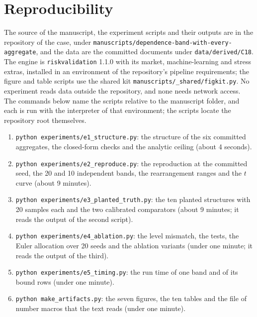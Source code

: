 \section{Reproducibility}
\label{sec:reproducibility}

The source of the manuscript, the experiment scripts and their outputs are in the repository of the case, under
\texttt{manuscripts/dependence-band-with-every-aggregate}, and the data are the committed documents under
\texttt{data/derived/C18}. The engine is \texttt{riskvalidation} 1.1.0 with its market, machine-learning and stress extras,
installed in an environment of the repository's pipeline requirements; the figure and table scripts use the shared kit
\texttt{manuscripts/\_shared/figkit.py}. No experiment reads data outside the repository, and none needs network access. The
commands below name the scripts relative to the manuscript folder, and each is run with the interpreter of that environment; the
scripts locate the repository root themselves.

\begin{enumerate}
\item \texttt{python experiments/e1\_structure.py}: the structure of the six
committed aggregates, the closed-form checks and the analytic ceiling (about 4 seconds).
\item \texttt{python experiments/e2\_reproduce.py}: the reproduction at the
committed seed, the 20 and 10 independent bands, the rearrangement ranges and the $t$ curve (about 9 minutes).
\item \texttt{python experiments/e3\_planted\_truth.py}: the ten planted
structures with 20 samples each and the two calibrated comparators (about 9 minutes; it reads the output of the second script).
\item \texttt{python experiments/e4\_ablation.py}: the level mismatch, the tests,
the Euler allocation over 20 seeds and the ablation variants (under one minute; it reads the output of the third).
\item \texttt{python experiments/e5\_timing.py}: the run time of one band and of its bound rows (under one minute).
\item \texttt{python make\_artifacts.py}: the seven figures, the ten tables and the
file of number macros that the text reads (under one minute).
\end{enumerate}

